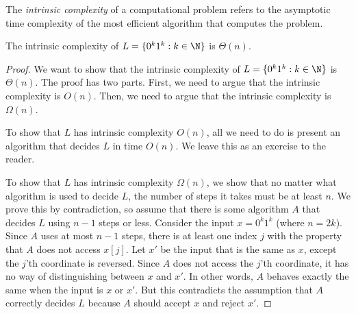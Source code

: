 \begin{note} \label{note:Intrinsic-complexity}
The \emph{intrinsic complexity} of a computational problem refers to the asymptotic time complexity of the most efficient algorithm that computes the problem.
\end{note}




\begin{flex}
\begin{proposition}  \label{proposition:Intrinsic-complexity-of-0k1k-:-k-in-N}
The intrinsic complexity of $L = \{0^k1^k : k \in \N\}$ is $\Theta(n)$.
\end{proposition}

\begin{proof}
We want to show that the intrinsic complexity of $L = \{0^k1^k : k \in \N\}$ is $\Theta(n)$. The proof has two parts. First, we need to argue that the intrinsic complexity is $O(n)$. Then, we need to argue that the intrinsic complexity is $\Omega(n)$.

To show that $L$ has intrinsic complexity $O(n)$, all we need to do is present an algorithm that decides $L$ in time $O(n)$. We leave this as an exercise to the reader.

To show that $L$ has intrinsic complexity $\Omega(n)$, we show that no matter what algorithm is used to decide $L$, the number of steps it takes must be at least $n$. We prove this by contradiction, so assume that there is some algorithm $A$ that decides $L$ using $n-1$ steps or less. Consider the input $x = 0^k1^k$ (where $n = 2k$). Since $A$ uses at most $n-1$ steps, there is at least one index $j$ with the property that $A$ does not access $x[j]$. Let $x'$ be the input that is the same as $x$, except the $j$'th coordinate is reversed. Since $A$ does not access the $j$'th coordinate, it has no way of distinguishing between $x$ and $x'$. In other words, $A$ behaves exactly the same when the input is $x$ or $x'$. But this contradicts the assumption that $A$ correctly decides $L$ because $A$ should accept $x$ and reject $x'$. 
\end{proof}
\end{flex}


